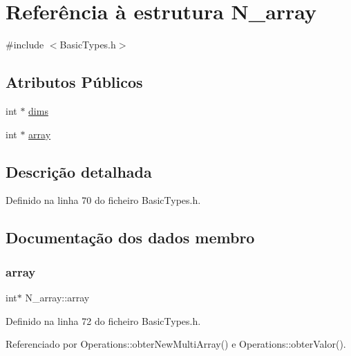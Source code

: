 \hypertarget{structN__array}{}\section{Referência à estrutura N\+\_\+array}
\label{structN__array}


{\ttfamily \#include $<$Basic\+Types.\+h$>$}

\subsection*{Atributos Públicos}
\begin{DoxyCompactItemize}
\item 
int $\ast$ \hyperlink{structN__array_ac4bcc6ba8cf97045350bdfbf7d25eaa0}{dims}
\item 
int $\ast$ \hyperlink{structN__array_a86947172fed28646e92c55904ce2907c}{array}
\end{DoxyCompactItemize}


\subsection{Descrição detalhada}


Definido na linha 70 do ficheiro Basic\+Types.\+h.



\subsection{Documentação dos dados membro}
\mbox{\label{structN__array_a86947172fed28646e92c55904ce2907c}} 
\subsubsection{\texorpdfstring{array}{array}}
{\footnotesize\ttfamily int$\ast$ N\+\_\+array\+::array}



Definido na linha 72 do ficheiro Basic\+Types.\+h.



Referenciado por Operations\+::obter\+New\+Multi\+Array() e Operations\+::obter\+Valor().

\mbox{\label{structN__array_ac4bcc6ba8cf97045350bdfbf7d25eaa0}} 
